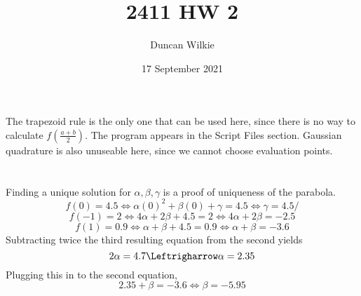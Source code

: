 \documentclass{article}
\title{2411 HW 2}
\author{Duncan Wilkie}
\date{17 September 2021}
\begin{document}
\maketitle

\section{}
The trapezoid rule is the only one that can be used here, since there is no way to calculate $f(\frac{a+b}{2})$.
The program appears in the Script Files section.
Gaussian quadrature is also unuseable here, since we cannot choose evaluation points.
\section{}
Finding a unique solution for $\alpha, \beta, \gamma$ is a proof of uniqueness of the parabola.
\[f(0)=4.5\Leftrightarrow \alpha(0)^2+\beta(0)+\gamma = 4.5 \Leftrightarrow \gamma = 4.5/\]
\[f(-1)=2\Leftrightarrow 4\alpha+2\beta + 4.5 = 2\Leftrightarrow 4\alpha+2\beta = -2.5\]
\[f(1)=0.9\Leftrightarrow \alpha+\beta + 4.5 = 0.9 \Leftrightarrow \alpha+\beta=-3.6\]
Subtracting twice the third resulting equation from the second yields
\[2\alpha = 4.7 \Leftrigharrow \alpha = 2.35\]
Plugging this in to the second equation,
\[2.35+\beta = -3.6\Leftrightarrow \beta = -5.95\]
\section{}
\end{document}
